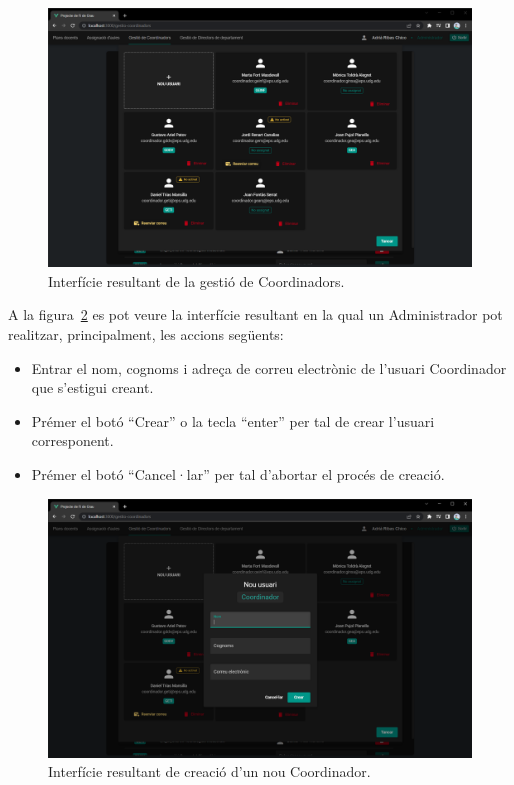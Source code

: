 \documentclass[a4paper,12pt]{ThesisStyle}
\begin{document}
\begin{figure}[H]
  \centering
  \includegraphics[width=\textwidth]{assets/results/usuaris/gestio.png}
  \caption{\label{img:resultats_usuaris_gestio}Interfície resultant de la gestió de Coordinadors.}
\end{figure}

\newpage

A la figura~\ref{img:resultats_usuaris_creacio} es pot veure la interfície resultant en la qual un Administrador pot realitzar, principalment, les accions següents:
\begin{itemize}
  \item Entrar el nom, cognoms i adreça de correu electrònic de l'usuari Coordinador que s'estigui creant.
  \item Prémer el botó ``Crear'' o la tecla ``enter'' per tal de crear l'usuari corresponent.
  \item Prémer el botó ``Cancel·lar'' per tal d'abortar el procés de creació.
\end{itemize}

\begin{figure}[H]
  \centering
  \includegraphics[width=\textwidth]{assets/results/usuaris/creacio.png}
  \caption{\label{img:resultats_usuaris_creacio}Interfície resultant de creació d'un nou Coordinador.}
\end{figure}
\end{document}
